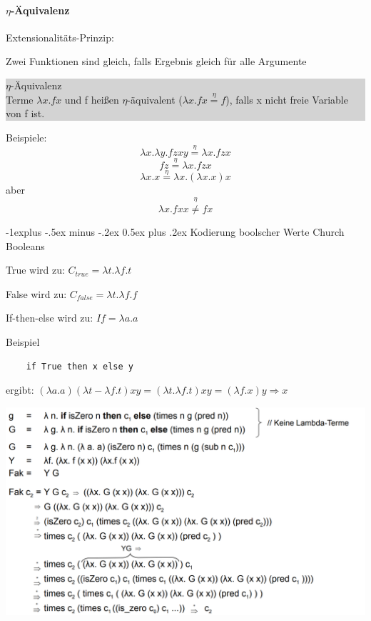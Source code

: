 \documentclass[10pt]{article}
\makeatletter
\renewcommand{\subsection}{\@startsection{subsection}{2}{0mm}%
                                {-1explus -.5ex minus -.2ex}%
                                {0.5ex plus .2ex}%
                                {\normalfont\normalsize\bfseries}}
\makeatother
\begin{document}
  \paragraph{$\eta$-Äquivalenz}

  Extensionalitäts-Prinzip: 
  \begin{itemize*}
    \item Zwei Funktionen sind gleich, falls Ergebnis gleich für alle Argumente
  \end{itemize*}
  \colorbox{lightgray} {
    \begin{minipage}[h]{.9\linewidth}
      $\eta$-Äquivalenz \\
      Terme $\lambda x.fx$ und f heißen $\eta$-äquivalent ($\lambda x.fx \stackrel{\eta}{=}  f$), falls x nicht freie Variable von f ist.
    \end{minipage}
  }
  
  Beispiele:
  $$\lambda x.\lambda y.f z x y \stackrel{\eta}{=}\lambda x.f z x$$
  $$f z \stackrel{\eta}{=}\lambda x.f z x$$
  $$\lambda x.x \stackrel{\eta}{=}\lambda x.(\lambda x.x)x$$
  aber $$\lambda x.f x x \stackrel{\eta}{\neq} f x$$
  
  \subsection{Kodierung boolscher Werte}
  Church Booleans
  \begin{itemize*}
    \item True wird zu: $C_{true} = \lambda t.\lambda f.t$
    \item False wird zu: $C_{false} = \lambda t.\lambda f.f$
    \item If-then-else wird zu: $If = \lambda a.a$
  \end{itemize*}
  
  Beispiel
  \begin{lstlisting}
    if True then x else y
\end{lstlisting}
  ergibt: $(\lambda a.a)(\lambda t- \lambda f.t) x y = (\lambda t.\lambda f.t) xy = (\lambda f.x)y \Rightarrow x$

  \begin{center}
    \includegraphics[width=0.4\linewidth]{Assets/Programmierparadigmen-Lambda_Abstraktion.png}
  \end{center}
  
\end{document}
